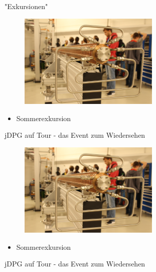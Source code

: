 \documentclass[
]{beamer}
\begin{document}
\begin{frame}{"Exkursionen"}
  \begin{minipage}{0.8\textwidth}
    \begin{figure}
      \centering
      \includegraphics[width=0.6\textwidth]{figure/soex_2017}
     \end{figure}
  \end{minipage}
  \begin{minipage}{0.2\textwidth}
    \begin{itemize}
      \item Sommerexkursion
    \end{itemize}
    jDPG auf Tour - das Event zum Wiedersehen
  \end{minipage}

  \begin{minipage}{0.8\textwidth}
    \begin{figure}
      \centering
      \includegraphics[width=0.6\textwidth]{figure/soex_2017}
     \end{figure}
  \end{minipage}
  \begin{minipage}{0.2\textwidth}
    \begin{itemize}
      \item Sommerexkursion
    \end{itemize}
    jDPG auf Tour - das Event zum Wiedersehen
  \end{minipage}
\end{frame}
\end{document}

